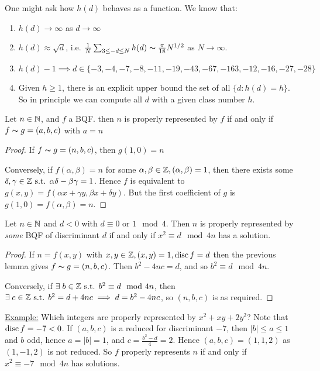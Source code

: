 \documentclass[10pt,a4paper]{article}
\begin{document}
One might ask how $h(d)$ behaves as a function. We know that:
\begin{enumerate}
\item $h(d) \to \infty$ as $d \to \infty$
\item $h(d) \approx \sqrt{d}$, i.e. $\frac{1}{N}\sum_{3\leq -d \leq N} h(d) \thicksim \frac{\pi}{18}N^{1/2}$ as $N \to \infty$.
\item $h(d) - 1 \implies d \in \{-3,-4,-7,-8,-11,-19,-43,-67,-163,-12,-16,-27,-28\}$
\item Given $h \geq 1$, there is an explicit upper bound the set of all $\{d:h(d) = h\}$. So in principle we can compute all $d$ with a given class number $h$.
\end{enumerate}
\begin{lemma}
Let $n \in \mathbb{N}$, and $f$ a BQF. then $n$ is properly represented by $f$ if and only if $f \thicksim g = (a,b,c)$ with $a = n$
\end{lemma}
\begin{proof}
If $f \thicksim g = (n,b,c)$, then $g(1,0) = n$

Conversely, if $f(\alpha,\beta) = n$ for some $\alpha, \beta \in \mathbb{Z}, (\alpha,\beta) = 1$, then there exists some $\delta, \gamma \in \mathbb{Z} \text{ s.t. } \alpha\delta-\beta\gamma = 1$. Hence $f$ is equivalent to $g(x,y) = f(\alpha x +\gamma y, \beta x+\delta y)$. But the first coefficient of $g$ is $g(1,0) = f(\alpha,\beta) = n$.
\end{proof}

\begin{theorem}
Let $n \in \mathbb{N}$ and $d < 0$ with $d \equiv 0$ or $1 \mod 4$. Then $n$ is properly represented by \textit{some} BQF of discriminant $d$ if and only if $x^2 \equiv d \mod 4n$ has a solution.
\end{theorem}
\begin{proof}
If $n = f(x,y)$ with $x,y \in \mathbb{Z}, (x,y) = 1, \operatorname{disc} f = d$ then the previous lemma gives $f \thicksim g=(n,b,c)$. Then $b^2-4nc = d$, and so $b^2 \equiv d \mod 4n$.

Conversely, if $\exists b \in \Z \st b^2 \equiv d \mod 4n$, then $\exists c \in \Z \st b^2 = d+4nc \implies d = b^2-4nc$, so $(n,b,c)$ is as required. 
\end{proof}
\underline{Example:} Which integers are properly represented by $x^2+xy+2y^2$? Note that $\operatorname{disc} f = -7 < 0$. If $(a,b,c)$ is a reduced for discriminant $-7$, then $|b| \leq a \leq 1$ and $b$ odd, hence $a = |b| = 1$, and $c = \frac{b^2-d}{4} = 2$. Hence $(a,b,c) = (1,1,2)$ as $(1,-1,2)$ is not reduced. So $f$ properly represents $n$ if and only if $x^2 \equiv -7 \mod 4n$ has solutions.
\end{document}

